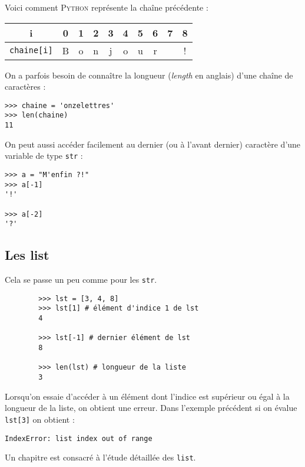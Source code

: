 Voici comment \textsc{Python} représente  la chaîne précédente :

\begin{center}
	\alternaterowcolors
	\tabstyle[UGLiBlue]
	\begin{tabular}{|c|c|c|c|c|c|c|c|c|c|}
		\hline
		\ccell  i    &  0 &   1 &   2 &   3 &   4 &   5 &   6 &   7 &   8 \\
		\hline
		\ccell \texttt{chaine[i]} & B      & o      & n      & j      & o      & u      & r      &        & !      \\
		\hline
	\end{tabular}
\end{center}

On a parfois besoin de connaître la longueur (\emph{length} en anglais) d'une chaîne de caractères :

\begin{pyc}\begin{verbatim}
>>> chaine = 'onzelettres'
>>> len(chaine)
11
\end{verbatim}
\end{pyc}

On peut aussi accéder facilement au dernier (ou à l'avant dernier) caractère d'une variable de type \texttt{str} :

\begin{pyc}
	\begin{verbatim}
>>> a = "M'enfin ?!"
>>> a[-1]
'!'

>>> a[-2]
'?'
\end{verbatim}
\end{pyc}

\subsection{Les list}

Cela se passe un peu comme pour les \texttt{str}.

\begin{pyc}
	\begin{verbatim}
		>>> lst = [3, 4, 8]
		>>> lst[1] # élément d'indice 1 de lst
		4

		>>> lst[-1] # dernier élément de lst
		8

		>>> len(lst) # longueur de la liste
		3
	\end{verbatim}
\end{pyc}

Lorsqu'on essaie d'accéder à un élément dont l'indice est supérieur ou égal à la longueur de la liste, on obtient une erreur. Dans l'exemple précédent si on évalue \texttt{lst[3]} on obtient :
\color{UGLiRed}
\begin{verbatim}
IndexError: list index out of range	
\end{verbatim}
\color{black}

Un chapitre est consacré à l'étude détaillée des \texttt{list}.

